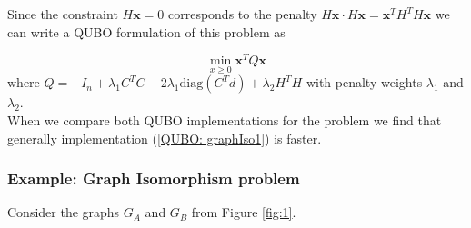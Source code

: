 \documentclass{article}
\begin{document}
\noindent Since the constraint \(H\mathbf{x} = 0\) corresponds to the penalty \(H\mathbf{x} \cdot H\mathbf{x} =  \mathbf{x}^T H^T H  \mathbf{x}\) we can write a QUBO formulation of this problem as

\begin{equation}\label{QUBO: graphIso2}
	\min_{x \geq 0} \mathbf{x}^T Q \mathbf{x}
\end{equation}
where \(Q = -I_n + \lambda_1 C^T C - 2\lambda_1\text{diag}(C^T d) + \lambda_2 H^T H\) with penalty weights \(\lambda_1\) and \(\lambda_2\).\\

\noindent When we compare both QUBO implementations for the problem we find that generally implementation (\ref{QUBO: graphIso1}) is faster.

\subsubsection{Example: Graph Isomorphism problem}
Consider the graphs \(G_A\) and \(G_B\) from Figure \ref{fig:1}. \\
\end{document}
